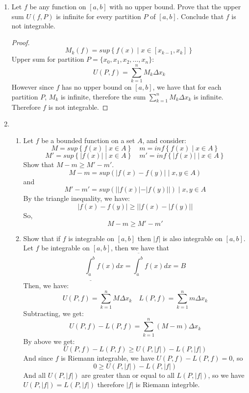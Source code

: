 \documentclass[hidelinks,12pt]{article}
\title{\scalebox{2}{Math 524 Homework 4}}
\author{\scalebox{1.5}{Theo Koss}}
\date{April 2024}
\renewcommand{\geq}{\geqslant}
\begin{document}
\maketitle
\begin{enumerate}
    \item Let $f$ be any function on $[a,b]$ with no upper bound. Prove that the upper sum $U(f,P)$ is infinite for every partition $P$ of $[a,b]$. Conclude that $f$ is not integrable.
        \begin{proof}
            \[M_k(f)=sup\left\{f(x)\mid x\in[x_{k-1},x_k]\right\}\]
            Upper sum for partition $P=\{x_0,x_1,x_2,\dots,x_n\}$:
            \[U(P,f)=\sum_{k=1}^nM_k\Delta x_k\]
            However since $f$ has no upper bound on $[a,b]$, we have that for each partition $P$, $M_k$ is infinite, therefore the sum $\sum_{k=1}^nM_k\Delta x_k$ is infinite. Therefore $f$ is not integrable.
        \end{proof}
    \item \begin{enumerate}
            \item Let $f$ be a bounded function on a set $A$, and consider:
                \[M=sup\left\{f(x)\mid x\in A\right\}\quad m=inf\left\{f(x)\mid x\in A\right\}\]
                \[M'=sup\left\{|f(x)|\mid x\in A\right\}\quad m'=inf\left\{|f(x)|\mid x\in A\right\}\]
                Show that $M-m\geq M'-m'$.
                \[M-m=sup(|f(x)-f(y)|\mid x,y\in A)\]
                and
                \[M'-m'=sup(||f(x)|-|f(y)||)\mid x,y\in A\]
                By the triangle inequality, we have:
                \[|f(x)-f(y)|\geq||f(x)-|f(y)||\]
                So,
                \[M-m\geq M'-m'\]
            \item Show that if $f$ is integrable on $[a,b]$ then $|f|$ is also integrable on $[a,b]$.
                Let $f$ be integrable on $[a,b]$, then we have that
                \[\underline{\int_a^b} f(x) d x=\overline{\int_a^b} f(x) d x=B\tag{Where B is a real number}\]
                Then, we have:
                \[U(P,f)=\sum_{k=1}^nM\Delta x_k\quad L(P,f)=\sum_{k=1}^nm\Delta x_k\]
                Subtracting, we get:
                \[U(P,f)-L(P,f)=\sum_{k=1}^n(M-m)\Delta x_k\]
                By above we get:
                \[U(P,f)-L(P,f)\geq U(P,|f|)-L(P,|f|)\]
                And since $f$ is Riemann integrable, we have $U(P,f)-L(P,f)=0$, so
                \[0\geq U(P,|f|)-L(P,|f|)\]
                And all $U(P,|f|)$ are greater than or equal to all $L(P,|f|)$, so we have $U(P,|f|)=L(P,|f|)$ therefore $|f|$ is Riemann integrble.

\end{enumerate}
\end{enumerate}
\end{document}
